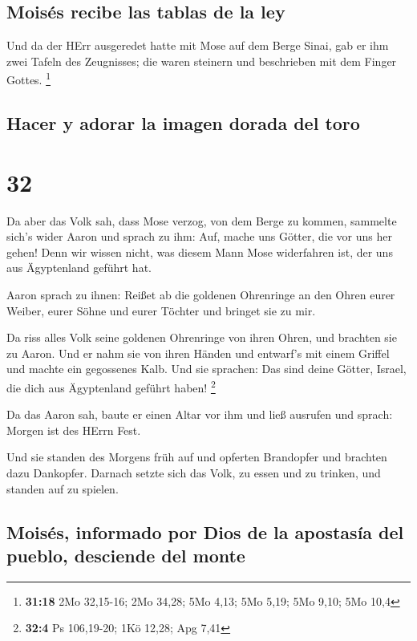 \hypertarget{moisuxe9s-recibe-las-tablas-de-la-ley}{%
\subsection{Moisés recibe las tablas de la
ley}\label{moisuxe9s-recibe-las-tablas-de-la-ley}}

 Und da der HErr ausgeredet hatte mit Mose auf dem Berge
Sinai, gab er ihm zwei Tafeln des Zeugnisses; die waren steinern und
beschrieben mit dem Finger Gottes. \footnote{\textbf{31:18} 2Mo
  32,15-16; 2Mo 34,28; 5Mo 4,13; 5Mo 5,19; 5Mo 9,10; 5Mo 10,4}

\hypertarget{hacer-y-adorar-la-imagen-dorada-del-toro}{%
\subsection{Hacer y adorar la imagen dorada del
toro}\label{hacer-y-adorar-la-imagen-dorada-del-toro}}

\hypertarget{section-31}{%
\section{32}\label{section-31}}

 Da aber das Volk sah, dass Mose verzog, von dem Berge zu
kommen, sammelte sich's wider Aaron und sprach zu ihm: Auf, mache uns
Götter, die vor uns her gehen! Denn wir wissen nicht, was diesem Mann
Mose widerfahren ist, der uns aus Ägyptenland geführt hat.

 Aaron sprach zu ihnen: Reißet ab die goldenen Ohrenringe
an den Ohren eurer Weiber, eurer Söhne und eurer Töchter und bringet sie
zu mir.

 Da riss alles Volk seine goldenen Ohrenringe von ihren
Ohren, und brachten sie zu Aaron.  Und er nahm sie von
ihren Händen und entwarf's mit einem Griffel und machte ein gegossenes
Kalb. Und sie sprachen: Das sind deine Götter, Israel, die dich aus
Ägyptenland geführt haben! \footnote{\textbf{32:4} Ps 106,19-20; 1Kö
  12,28; Apg 7,41}

 Da das Aaron sah, baute er einen Altar vor ihm und ließ
ausrufen und sprach: Morgen ist des HErrn Fest.

 Und sie standen des Morgens früh auf und opferten
Brandopfer und brachten dazu Dankopfer. Darnach setzte sich das Volk, zu
essen und zu trinken, und standen auf zu spielen.

\hypertarget{moisuxe9s-informado-por-dios-de-la-apostasuxeda-del-pueblo-desciende-del-monte}{%
\subsection{Moisés, informado por Dios de la apostasía del pueblo,
desciende del
monte}\label{moisuxe9s-informado-por-dios-de-la-apostasuxeda-del-pueblo-desciende-del-monte}}

